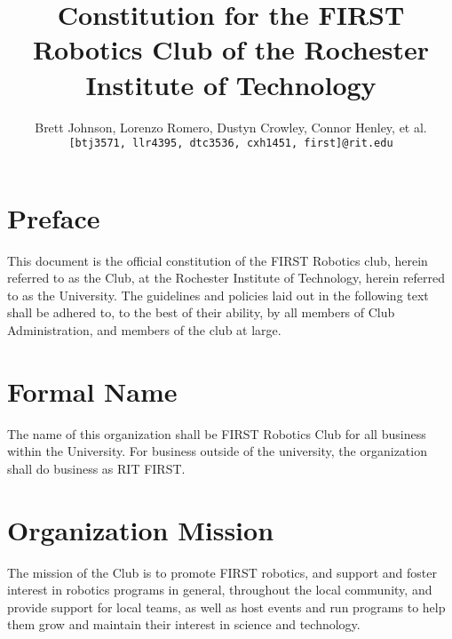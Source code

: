 \documentclass[english,11pt]{article}
\renewcommand{\footrulewidth}{1pt} %
\begin{document}
\title{Constitution for the FIRST Robotics Club of the Rochester Institute of Technology}
\author{
    Brett Johnson, Lorenzo Romero, Dustyn Crowley, Connor Henley, et al.  %
    \\    
    \texttt{[btj3571, llr4395, dtc3536, cxh1451, first]@rit.edu}
}
\date{} %

\fancypagestyle{plain}{
    \fancyhf{}
    \rfoot{\today}
    \renewcommand{\footrulewidth}{0pt} %
}

\maketitle
\newpage %


\section*{Preface}
This document is the official constitution of the FIRST Robotics club, herein referred to as the Club, at the Rochester Institute of Technology, herein referred to as the University.
The guidelines and policies laid out in the following text shall be adhered to, to the best of their ability, by all members of Club Administration, and members of the club at large.

\section{Formal Name} \label{art:formal-name}
The name of this organization shall be FIRST Robotics Club for all business within the University. 
For business outside of the university, the organization shall do business as RIT FIRST.

\section{Organization Mission} \label{art:mission}
The mission of the Club is to promote FIRST robotics, and support and foster interest in robotics programs in general, throughout the local community, and provide support for local teams, as well as host events and run programs to help them grow and maintain their interest in science and technology.
\end{document}
